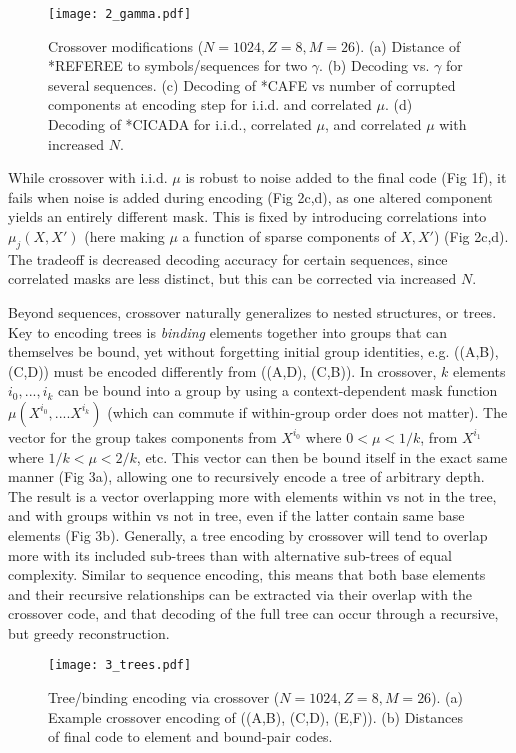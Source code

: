 \documentclass{article}
\begin{document}
\begin{figure}
\label{fig:2}
  \centering
  \texttt{[image: 2\_gamma.pdf]}
  \caption{Crossover modifications ($N=1024, Z=8, M=26$). (a) Distance of *REFEREE to symbols/sequences for two $\gamma$. (b) Decoding vs. $\gamma$ for several sequences. (c) Decoding of *CAFE vs number of corrupted components at encoding step for i.i.d. and correlated $\mu$. (d) Decoding of *CICADA for i.i.d., correlated $\mu$, and correlated $\mu$ with increased $N$.}
\end{figure}

While crossover with i.i.d. $\mu$ is robust to noise added to the final code (Fig 1f), it fails when noise is added during encoding (Fig 2c,d), as one altered component yields an entirely different mask. This is fixed by introducing correlations into $\mu_j(X, X')$ (here making $\mu$ a function of sparse components of $X, X'$) (Fig 2c,d). The tradeoff is decreased decoding accuracy for certain sequences, since correlated masks are less distinct, but this can be corrected via increased $N$.

Beyond sequences, crossover naturally generalizes to nested structures, or trees. Key to encoding trees is \textit{binding} elements together into groups that can themselves be bound, yet without forgetting initial group identities, e.g. ((A,B), (C,D)) must be encoded differently from ((A,D), (C,B)). In crossover, $k$ elements $i_0, ..., i_k$ can be bound into a group by using a context-dependent mask function $\mu(X^{i_0}, .... X^{i_k})$ (which can commute if within-group order does not matter). The vector for the group takes components from $X^{i_0}$ where $0 < \mu < 1/k$, from $X^{i_1}$ where $1/k < \mu < 2/k$, etc. This vector can then be bound itself in the exact same manner (Fig 3a), allowing one to recursively encode a tree of arbitrary depth. The result is a vector overlapping more with elements within vs not in the tree, and with groups within vs not in tree, even if the latter contain same base elements (Fig 3b). Generally, a tree encoding by crossover will tend to overlap more with its included sub-trees than with alternative sub-trees of equal complexity. Similar to sequence encoding, this means that both base elements and their recursive relationships can be extracted via their overlap with the crossover code, and that decoding of the full tree can occur through a recursive, but greedy reconstruction.

\begin{figure}
\label{fig:3}
  \centering
  \texttt{[image: 3\_trees.pdf]}
  \caption{Tree/binding encoding via crossover ($N=1024, Z=8, M=26$). (a) Example crossover encoding of ((A,B), (C,D), (E,F)). (b) Distances of final code to element and bound-pair codes.}
\end{figure}
\end{document}
